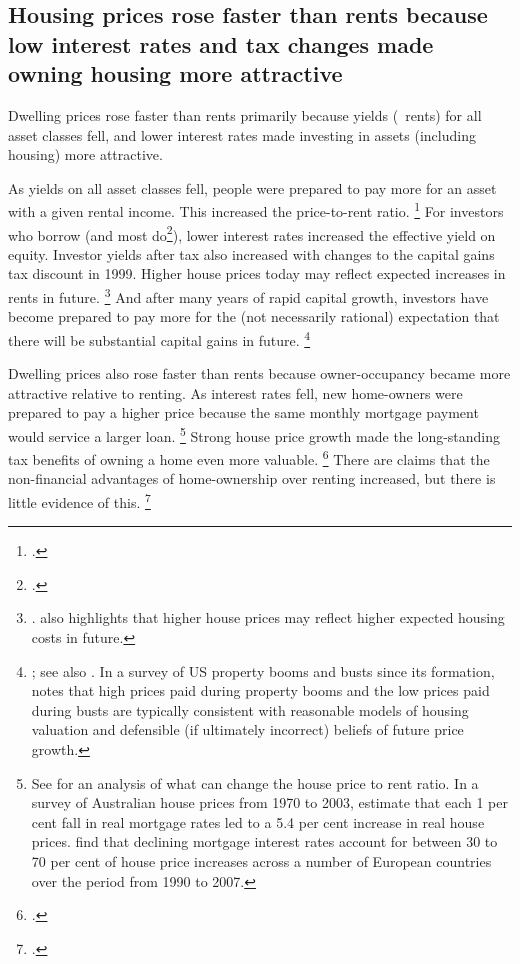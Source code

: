 \subsection{Housing prices rose faster than rents because low interest rates and tax changes made owning housing more attractive}\label{subsec:housing-prices-rose-faster-than-rents-because-tax-changes-and-low-interest-rates-made-owner-occupancy-and-housing-investment-more-attractive}

Dwelling prices rose faster than rents primarily because yields (\ie~rents) for all asset classes fell, and lower interest rates made investing in assets (including housing) more attractive.

As yields on all asset classes fell, people were prepared to pay more for an asset with a given rental income. This increased the price-to-rent ratio.%
	\footcites[][Figure~7]{HousingAus17}{2010BirdsEyeView}{hatzviottorents2008}
For investors who borrow (and most do\footcite[][Figure~9]{DaleyWood2016-Negative-Gearing-CGT}), lower interest rates increased the effective yield on equity.
Investor yields after tax also increased with changes to the capital gains tax discount in 1999. Higher house prices today may reflect expected increases in rents in future.%
	\footnote{\textcite{Bracke2015houseprices}. \textcite{Lowe-national-balance-sheet-speech} also highlights that higher house prices may reflect higher expected housing costs in future.}
And after many years of rapid capital growth, investors have become prepared to pay more for the (not necessarily rational) expectation that there will be substantial capital gains in future.%
	\footnote{\textcite{FoxTulip2014overvalued}; see also \textcite{KishnorMorley2015}.
	In a survey of US property booms and busts since its formation, \textcite[][3]{Glaeser-2013-Natio-of-gamblers} notes that high prices paid during property booms and the low prices paid during busts are typically consistent with reasonable models of housing valuation and defensible (if ultimately incorrect) beliefs of future price growth.}

Dwelling prices also rose faster than rents because owner-occupancy became more attractive relative to renting.
As interest rates fell, new home-owners were prepared to pay a higher price because the same monthly mortgage payment would service a larger loan.%
	\footnote{See \textcites{Sommeretal-2010}{2010BirdsEyeView} for an analysis of what can change the house price to rent ratio.
    In a survey of Australian house prices from 1970 to 2003, \textcite{Abelsonetal2005} estimate that each 1 per cent fall in real mortgage rates led to a 5.4 per cent increase in real house prices.
    \textcite{Miles-Pillonca-2008} find that declining mortgage interest rates account for between 30 to 70 per cent of house price increases across a number of European countries over the period from 1990 to 2007.}
Strong house price growth made the long-standing tax benefits of owning a home
even more valuable.
	\footcite{KellyHarrisonHunterEtAl2013}
There are claims that the non-financial advantages of home-ownership over renting increased, but there is little evidence of this.%
	\footcite{FoxTulip2014overvalued}

